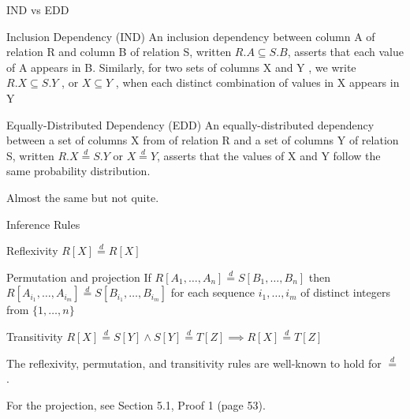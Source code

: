 \documentclass[10pt]{beamer}
\newcommand{\eqdist}{\stackrel{d}{=}}
\begin{document}
\begin{frame}{IND vs EDD}
    \begin{block}{Inclusion Dependency (IND)}
        \smallskip
        An inclusion dependency between column A of relation
        R and column B of relation S, written $R.A \subseteq S.B$, asserts that each
        value of A appears in B. Similarly, for two sets of columns X
        and Y , we write $R.X \subseteq S.Y$ , or $X \subseteq Y$ , when each distinct
        combination of values in X appears in Y~\cite{abedjan2015}
    \end{block}
    \begin{block}{Equally-Distributed Dependency (EDD)}
        \smallskip
        An equally-distributed dependency between a set of columns X from
        of relation R and a set of columns Y of relation S, written $R.X \eqdist S.Y$ or
        $X \eqdist Y$, asserts that the values of X and Y follow the same probability distribution.
    \end{block}
    \alert{Almost the same} but not quite.
\end{frame}

\begin{frame}{Inference Rules}
    \begin{block}{Reflexivity}
        $R[X] \eqdist R[X]$
    \end{block}
    \begin{block}{Permutation and projection}
        If $R[A_1,\dots,A_n] \eqdist S[B_1,\dots,B_n]$ then
        $R[A_{i_1},\dots,A_{i_m}] \eqdist S[B_{i_1},\dots,B_{i_m}]$ for each sequence
        $i_1,\dots,i_m$ of distinct integers from $\{1,\dots,n\}$
    \end{block}
    \begin{block}{Transitivity}
        $ R[X] \eqdist S[Y] \land S[Y] \eqdist T[Z] \implies R[X] \eqdist T[Z]$
    \end{block}
    
    \begin{block}{}
    The reflexivity, permutation, and transitivity rules are well-known to hold
    for $\eqdist$ \cite{randles1979introduction}.

    For the projection, see \alert{Section 5.1, Proof 1} (page 53).
    \end{block}
\end{frame}
\end{document}
